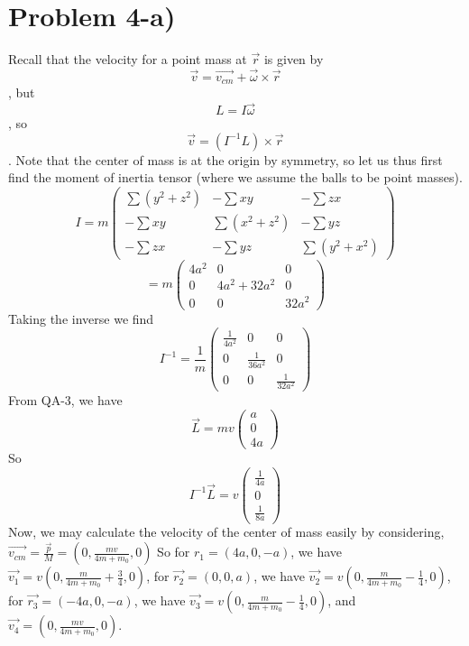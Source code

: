 \section*{Problem 4-a)}
Recall that the velocity for a point mass at $\vec{r}$ is given by
\[ \vec{v} = \vec{v_{cm}}+\vec{\omega} \times \vec{r} \]
, but
\[ L = I\vec{\omega} \]
, so
\[ \vec{v}  = (I^{-1} L) \times \vec{r} \].
Note that the center of mass is at the origin by symmetry, so
let us thus first find the moment of inertia tensor (where we assume  the balls to be point masses).
\[ I = m\begin{pmatrix} 
\sum (y^2 + z^2) & - \sum xy & - \sum zx \\
- \sum xy & \sum (x^2+z^2) & -\sum yz \\
- \sum zx & -\sum yz & \sum (y^2 + x^2) 
\end{pmatrix}  \]\[
= m\begin{pmatrix}  4a^2 & 0 & 0 \\
0 & 4a^2 + 32 a^2 & 0 \\
0 & 0 & 32 a^2 
\end{pmatrix}
\]
Taking the inverse we find
\[ I^{-1} = \frac{1}{m}\begin{pmatrix}  \frac{1}{4a^2} & 0 & 0 \\
0 & \frac{1}{36a^2} & 0 \\
0 & 0 & \frac{1}{32 a^2} 
\end{pmatrix}\]
From QA-3, we have
\[ \vec{L} = mv\begin{pmatrix}
a \\ 0 \\ 4a
\end{pmatrix} \]
So 
\[ I^{-1}  \vec{L}  = v\begin{pmatrix} \frac{1}{4a} \\
0  \\
\frac{1}{8 a} 
\end{pmatrix}\]
Now, we may calculate the velocity of the center of mass easily by considering, $\vec{v_{cm}} = \frac{\vec{p}}{M} = (0,\frac{mv}{4m+m_0},0)$
So for $r_1=(4a,0,-a)$, we have $\vec{v_1}=v(0,\frac{m}{4m+m_0}+\frac{3}{4},0)$, for $\vec{r_2}=(0,0,a)$, we have $\vec{v_2}=v(0,\frac{m}{4m+m_0}-\frac{1}{4},0)$, for $\vec{r_3}=(-4a,0,-a)$, we have $\vec{v_3}=v(0,\frac{m}{4m+m_0}-\frac{1}{4},0)$, and $\vec{v_4}=(0,\frac{mv}{4m+m_0},0)$.
